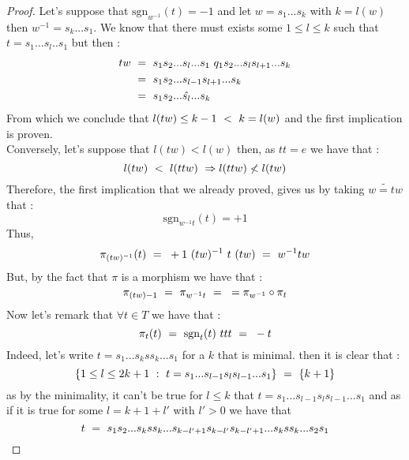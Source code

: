 \begin{proof}
	Let's suppose that $\mbox{sgn}_{w^{-1}}(t)=-1$ and let $w=s_1...s_k$ with $k=l(w)$ then $w^{-1}=s_k...s_1$. We know that there must exists some $1\leq l\leq k$ such that $t=s_1...s_l..s_1$ but then :
	\begin{equation}
	\begin{split}
	tw\text{ }&=\text{ } s_1s_2...s_l...s_1\text{ } q_1s_2...s_ls_{l+1}...s_k\\
	&=\text{ } s_1s_2...s_{l-1}s_{l+1}...s_k\\
	&=\text{ } s_1s_2...\hat{s_l}...s_k
	\end{split}
	\end{equation}
	From which we conclude that $l(tw)\leq k-1\text{ } <\text{ } k=l(w)$ and the first implication is proven.\\
	Conversely, let's suppose that $l(tw)<l(w)$ then, as $tt=e$ we have that :
	\begin{equation}
	l(tw)\text{ } <\text{ } l(ttw)\text{ } \Rightarrow l(ttw)\not<l(tw) 
	\end{equation} 
	Therefore, the first implication that we already proved, gives us by taking $\tilde{w=tw}$ that :
	\begin{equation}
	\mbox{sgn}_{w^{-1}t}(t)=+1
	\end{equation}
	Thus, 
	\begin{equation}
	\pi_{(tw)^{-1}}(t)\text{ }=\text{ } +1 \text{ } (tw)^{-1}\text{ } t\text{ }(tw)\text{ }=\text{ } w^{-1}tw
	\end{equation}
	But, by the fact that $\pi$ is a morphism we have that :
	\begin{equation}\label{pi est un homo}
	\pi_{(tw){-1}}\text{ }=\text{ }\pi_{w^{-1}t}\text{ }=\text{ } =\pi_{w^{-1}}\circ\pi_t
	\end{equation}
	Now let's remark that $\forall t\in T$ we have that :
	\begin{equation}
	\pi_t(t)\text{ }=\text{ } \mbox{sgn}_t(t)\text{ } ttt\text{ }=\text{ } -t
	\end{equation}
	Indeed, let's write $t=s_1...s_kss_k...s_1$ for a $k$ that is minimal. then it is clear that :
	\begin{equation}\label{le signe de t de t}
	\{1\leq l\leq 2k+1\text{ } :\text{ } t=s_1...s_{l-1}s_l s_{l-1}...s_1\}\text{ }=\text{ } \{k+1\}
	\end{equation}
	as by the minimality, it can't be true for $l\leq k$ that $t=s_1...s_{l-1}s_l s_{l-1}...s_1$ and as if it is true for some $l= k+1+l'$ with $l'>0$ we have that 
	\begin{equation}
	t\qq=\qq s_1s_2...s_kss_k...s_{k-l'+1}s_{k-l'}s_{k-l'+1}...s_kss_k...s_2s_1

\end{equation}
\end{proof}
